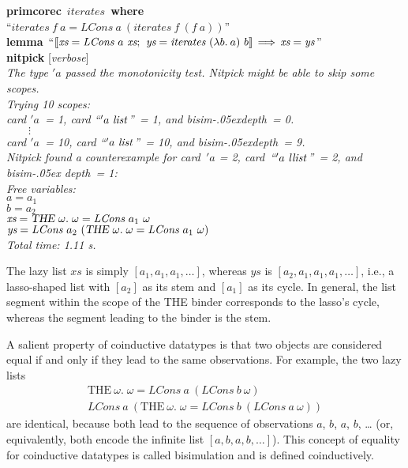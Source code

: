 \documentclass[a4paper,12pt]{article}
\renewcommand\_{\hbox{\textunderscore\kern-.05ex}}
\begin{document}
\prew
\textbf{primcorec}~$\textit{iterates}$~\textbf{where} \\
``$\textit{iterates}~f\>a = \textit{LCons}~a~(\textit{iterates}~f\>(f\>a))$'' \\[2\smallskipamount]
\textbf{lemma}~``$\mathopen{[\![}\textit{xs} = \textit{LCons}~a~\textit{xs};\>\,
\textit{ys} = \textit{iterates}~(\lambda b.\> a)~b\mathclose{]\!]} \,\Longrightarrow\, \textit{xs} = \textit{ys\/}$'' \\
\textbf{nitpick} [\textit{verbose}] \\[2\smallskipamount]
\slshape The type $'a$ passed the monotonicity test. Nitpick might be able to skip
some scopes. \\[2\smallskipamount]
Trying 10 scopes: \\
\hbox{}\qquad \textit{card} $'a$~= 1, \textit{card} ``\kern1pt$'a~\textit{list\/}$''~= 1,
and \textit{bisim\_depth}~= 0. \\
\hbox{}\qquad $\qquad\vdots$ \\[.5\smallskipamount]
\hbox{}\qquad \textit{card} $'a$~= 10, \textit{card} ``\kern1pt$'a~\textit{list\/}$''~= 10,
and \textit{bisim\_depth}~= 9. \\[2\smallskipamount]
Nitpick found a counterexample for {\itshape card}~$'a$ = 2,
\textit{card}~``\kern1pt$'a~\textit{llist\/}$''~= 2, and \textit{bisim\_\allowbreak
depth}~= 1:
\\[2\smallskipamount]
\hbox{}\qquad Free variables: \nopagebreak \\
\hbox{}\qquad\qquad $\textit{a} = a_1$ \\
\hbox{}\qquad\qquad $\textit{b} = a_2$ \\
\hbox{}\qquad\qquad $\textit{xs} = \textsl{THE}~\omega.\; \omega = \textit{LCons}~a_1~\omega$ \\
\hbox{}\qquad\qquad $\textit{ys} = \textit{LCons}~a_2~(\textsl{THE}~\omega.\; \omega = \textit{LCons}~a_1~\omega)$ \\[2\smallskipamount]
Total time: 1.11 s.
\postw

The lazy list $\textit{xs}$ is simply $[a_1, a_1, a_1, \ldots]$, whereas
$\textit{ys}$ is $[a_2, a_1, a_1, a_1, \ldots]$, i.e., a lasso-shaped list with
$[a_2]$ as its stem and $[a_1]$ as its cycle. In general, the list segment
within the scope of the {THE} binder corresponds to the lasso's cycle, whereas
the segment leading to the binder is the stem.

A salient property of coinductive datatypes is that two objects are considered
equal if and only if they lead to the same observations. For example, the two
lazy lists
%
\begin{gather*}
\textrm{THE}~\omega.\; \omega = \textit{LCons}~a~(\textit{LCons}~b~\omega) \\
\textit{LCons}~a~(\textrm{THE}~\omega.\; \omega = \textit{LCons}~b~(\textit{LCons}~a~\omega))
\end{gather*}
%
are identical, because both lead
to the sequence of observations $a$, $b$, $a$, $b$, \hbox{\ldots} (or,
equivalently, both encode the infinite list $[a, b, a, b, \ldots]$). This
concept of equality for coinductive datatypes is called bisimulation and is
defined coinductively.
\end{document}
